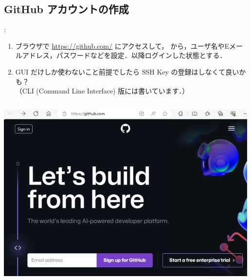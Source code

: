 \documentclass[aspectratio=169,dvipdfmx,cjk]{beamer}
\begin{document}
\subsection{GitHub アカウントの作成}
\begin{frame}{\insertsection \thesubsection: \insertsubsection}
  \begin{enumerate}
    \item ブラウザで \href{https://github.com/}{https://github.com/} にアクセスして， から，ユーザ名やEメールアドレス，パスワードなどを設定\cite{GitHubAccount}．以降ログインした状態とする．
    \item GUI だけしか使わないこと前提でしたら SSH Key の登録はしなくて良いかも？\\（CLI (Command Line Interface) 版には書いています．）
  \end{enumerate}
  \begin{columns}
    \begin{column}{0.4\textwidth}
        \includegraphics[width=1.0\linewidth]{fig/github.png}
    \end{column}
  \end{columns}
\end{frame}
\end{document}
